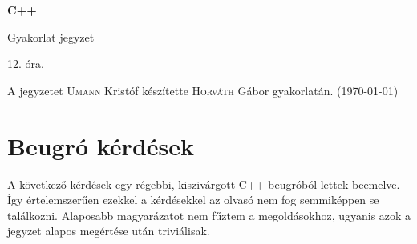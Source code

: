 \documentclass[a4paper,11.5pt,table]{article}
\begin{document}
	\setlength\parindent{0pt}
	\def\<{<\hspace{0mm}<}
	
	\theoremstyle{definition}
	\newtheorem{note}{Megjegyzés}[subsection]
	
	\begin{center}
		{\LARGE\textbf{C++}}
		
		{\Large Gyakorlat jegyzet}
		
		12. óra.
	\end{center}
	A jegyzetet \textsc{Umann} Kristóf készítette \textsc{Horváth} Gábor  gyakorlatán. (\today)
	\medskip
	
	\section{Beugró kérdések}
	A következő kérdések egy régebbi, kiszivárgott C++ beugróból lettek beemelve. Így értelemszerűen ezekkel a kérdésekkel az olvasó nem fog semmiképpen se találkozni. Alaposabb magyarázatot nem fűztem a megoldásokhoz, ugyanis azok a jegyzet alapos megértése után triviálisak.
\end{document}
